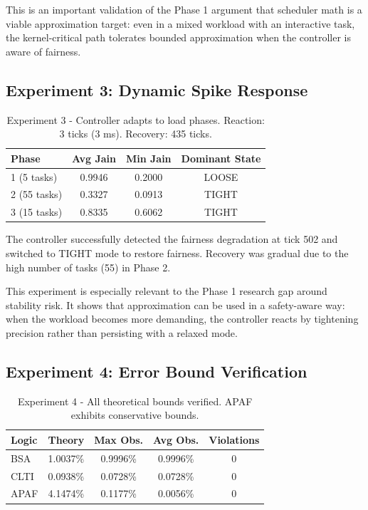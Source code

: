 \documentclass[conference]{IEEEtran}
\begin{document}
This is an important validation of the Phase 1 argument that scheduler math is a viable approximation target: even in a mixed workload with an interactive task, the kernel-critical path tolerates bounded approximation when the controller is aware of fairness.

\subsection{Experiment 3: Dynamic Spike Response}

\begin{table}[h]
\centering
\begin{tabular}{|l|c|c|c|}
\hline
\textbf{Phase} & \textbf{Avg Jain} & \textbf{Min Jain} & \textbf{Dominant State} \\
\hline
1 (5 tasks) & 0.9946 & 0.2000 & LOOSE \\
2 (55 tasks) & 0.3327 & 0.0913 & TIGHT \\
3 (15 tasks) & 0.8335 & 0.6062 & TIGHT \\
\hline
\end{tabular}
\label{tab:exp3}
\caption{Experiment 3 - Controller adapts to load phases. Reaction: 3 ticks (3 ms). Recovery: 435 ticks.}
\end{table}

The controller successfully detected the fairness degradation at tick 502 and switched to TIGHT mode to restore fairness. Recovery was gradual due to the high number of tasks (55) in Phase 2.

This experiment is especially relevant to the Phase 1 research gap around stability risk. It shows that approximation can be used in a safety-aware way: when the workload becomes more demanding, the controller reacts by tightening precision rather than persisting with a relaxed mode.

\subsection{Experiment 4: Error Bound Verification}

\begin{table}[h]
\centering
\begin{tabular}{|l|c|c|c|c|}
\hline
\textbf{Logic} & \textbf{Theory} & \textbf{Max Obs.} & \textbf{Avg Obs.} & \textbf{Violations} \\
\hline
BSA & 1.0037\% & 0.9996\% & 0.9996\% & 0 \\
CLTI & 0.0938\% & 0.0728\% & 0.0728\% & 0 \\
APAF & 4.1474\% & 0.1177\% & 0.0056\% & 0 \\
\hline
\end{tabular}
\label{tab:exp4}
\caption{Experiment 4 - All theoretical bounds verified. APAF exhibits conservative bounds.}
\end{table}
\end{document}
